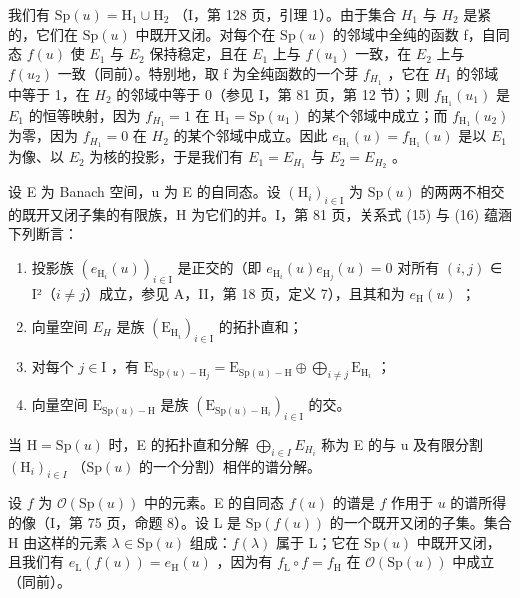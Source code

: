 我们有 \(\mathrm{Sp}(u)=\mathrm{H}_{1}\cup\mathrm{H}_{2}\) （I，第 128 页，引理 1）。由于集合 \(H_{1}\) 与 \(H_{2}\) 是紧的，它们在 \(\mathrm{Sp}(u)\) 中既开又闭。对每个在 \(\mathrm{Sp}(u)\) 的邻域中全纯的函数 f，自同态 \(f(u)\) 使 \(E_{1}\) 与 \(E_{2}\) 保持稳定，且在 \(E_{1}\) 上与 \(f(u_{1})\) 一致，在 \(E_{2}\) 上与 \(f(u_{2})\) 一致（同前）。特别地，取 f 为全纯函数的一个芽 \(f_{H_{1}}\) ，它在 \(H_{1}\) 的邻域中等于 1，在 \(H_{2}\) 的邻域中等于 0（参见 I，第 81 页，第 12 节）；则 \(f_{\mathrm{H}_{1}}(u_{1})\) 是 \(E_{1}\) 的恒等映射，因为 \(f_{H_{1}}=1\) 在 \(\mathrm{H}_{1}=\mathrm{Sp}(u_{1})\) 的某个邻域中成立；而 \(f_{\mathrm{H}_{1}}(u_{2})\) 为零，因为 \(f_{H_{1}}=0\) 在 \(H_{2}\) 的某个邻域中成立。因此 \(e_{\mathrm{H}_{1}}(u)=f_{\mathrm{H}_{1}}(u)\) 是以 \(E_{1}\) 为像、以 \(E_{2}\) 为核的投影，于是我们有 \(E_{1}=E_{H_{1}}\) 与 \(E_{2}=E_{H_{2}}\) 。

设 E 为 Banach 空间，u 为 E 的自同态。设 \((\mathrm{H}_{i})_{i\in\mathrm{I}}\) 为 \(\mathrm{Sp}(u)\) 的两两不相交的既开又闭子集的有限族，H 为它们的并。I，第 81 页，关系式 (15) 与 (16) 蕴涵下列断言：

\begin{enumerate}
\def\labelenumi{\alph{enumi})}
\item
  投影族 \((e_{\mathrm{H}_{i}}(u))_{i\in\mathrm{I}}\) 是正交的（即 \(e_{\mathrm{H}_{i}}(u)e_{\mathrm{H}_{j}}(u)=0\) 对所有 \((i,j)\) ∈ I²（\(i\neq j\)）成立，参见 A，II，第 18 页，定义 7），且其和为 \(e_{\mathrm{H}}(u)\) ；
\item
  向量空间 \(E_{H}\) 是族 \((\mathrm{E}_{\mathrm{H}_{i}})_{i\in\mathrm{I}}\) 的拓扑直和；
\item
  对每个 \(j \in \mathrm{I}\) ，有 \(\mathrm{E}_{\mathrm{Sp}(u) - \mathrm{H}_j} = \mathrm{E}_{\mathrm{Sp}(u) - \mathrm{H}} \oplus \bigoplus_{i \neq j} \mathrm{E}_{\mathrm{H}_i}\) ；
\item
  向量空间 \(\mathrm{E}_{\mathrm{Sp}(u)-\mathrm{H}}\) 是族 \((\mathrm{E}_{\mathrm{Sp}(u)-\mathrm{H}_i})_{i\in\mathrm{I}}\) 的交。
\end{enumerate}

当 \(\mathrm{H} = \mathrm{Sp}(u)\) 时，E 的拓扑直和分解 \(\bigoplus_{i \in I} E_{H_i}\) 称为 E 的与 u 及有限分割 \((\mathrm{H}_i)_{i \in I}\) （\(\mathrm{Sp}(u)\) 的一个分割）相伴的谱分解。

设 \(f\) 为 \(\mathcal{O}(\mathrm{Sp}(u))\) 中的元素。E 的自同态 \(f(u)\) 的谱是 \(f\) 作用于 \(u\) 的谱所得的像（I，第 75 页，命题 8）。设 L 是 \(\mathrm{Sp}(f(u))\) 的一个既开又闭的子集。集合 H 由这样的元素 \(\lambda \in \mathrm{Sp}(u)\) 组成：\(f(\lambda)\) 属于 L；它在 \(\mathrm{Sp}(u)\) 中既开又闭，且我们有 \(e_{\mathrm{L}}(f(u)) = e_{\mathrm{H}}(u)\) ，因为有 \(f_{\mathrm{L}} \circ f = f_{\mathrm{H}}\) 在 \(\mathcal{O}(\mathrm{Sp}(u))\) 中成立（同前）。

